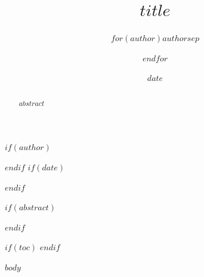 \documentclass[12pt,a4paper]{report}
\begin{document}
\title{$title$}
$if(author)$
\author{$for(author)$$author$$sep$ \and $endfor$}
$endif$
$if(date)$
\date{$date$}
$endif$
\maketitle

$if(abstract)$
\begin{abstract}
$abstract$
\end{abstract}
$endif$

$if(toc)$
\tableofcontents
$endif$

$body$
\end{document}
